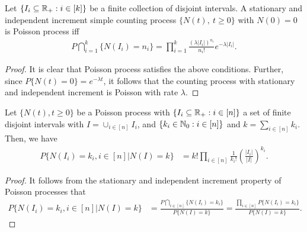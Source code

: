 \documentclass[a4paper,10pt,english]{article}
\begin{document}
\begin{prop}[Characterization 2] 
Let $\{I_i \subseteq \mathbb{R}_+: i \in [k]\}$ be a finite collection of disjoint intervals. 
A stationary and independent increment simple counting process $\{N(t),~t\geqslant 0\}$ with $N(0) = 0$ is Poisson process iff 
\begin{align*}
  P\bigcap_{i=1}^k \{N(I_i)= n_{i}\} = \prod_{i=1}^{k}\frac{(\lambda|I_i|)^{n_{i}}}{n_{i}!} e^{-\lambda |I_i|}.
\end{align*}
\end{prop}
\begin{proof} 
It is clear that Poisson process satisfies the above conditions. 
Further, since $P\{N(t)=0\} = e^{-\lambda t}$, it follows that the counting process with stationary and independent increment is Poisson with rate $\lambda$.  
\end{proof}

\begin{prop}\label{Prop:SIIPoisson}
Let $\{N(t), t\geqslant 0\}$ be a Poisson process with $\{I_i \subseteq \mathbb{R}_+: i \in [n]\}$ a set of finite disjoint intervals with $I = \cup_{i \in [n]}I_i$, and $\{k_i \in \mathbb{N}_0: i \in [n]\}$ and $k = \sum_{i \in [n]}k_i$. 
Then, we have 
\begin{align*}
P\{N(I_i) = k_i, i\in [n] | N(I) = k\} &= k!\prod_{i \in [n]}\frac{1}{k_i!}\left(\frac{|I_i|}{|I|}\right)^{k_i}.
\end{align*}
\end{prop}
\begin{proof}
It follows from the stationary and independent increment property of Poisson processes that
\begin{align*}
P\{N(I_i) = k_i, i\in [n] | N(I) = k\} &= \frac{P\bigcap_{i \in [n]}\{N(I_i) = k_i\}}{P\{N(I) = k\}} = \frac{\prod_{i \in [n]}P\{N(I_i) = k_i\}}{P\{N(I)= k\}}.
\end{align*}
\end{proof}
\end{document}
